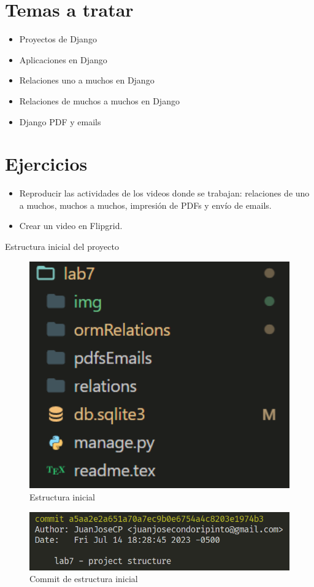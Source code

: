 \documentclass{article}
\begin{document}
\section{Temas a tratar}
        \begin{itemize}
            \item Proyectos de Django
            \item Aplicaciones en Django
            \item Relaciones uno a muchos en Django
            \item Relaciones de muchos a muchos en Django
            \item Django PDF y emails
        \end{itemize}
    
\section{Ejercicios}
\begin{itemize}
    \item Reproducir las actividades de los videos donde se trabajan: relaciones de uno a muchos, muchos a muchos, impresión de PDFs y envío de emails.
    \item Crear un video en Flipgrid.
\end{itemize} 

    Estructura inicial del proyecto
    \begin{figure}
        \centering
        \includegraphics[width=150mm]{img/img0.png}
        \caption{Estructura inicial}
        \label{fig:enter-label}
    \end{figure}
    \begin{figure}
        \centering
        \includegraphics[width=150mm]{img/commit1.png}
        \caption{Commit de estructura inicial}
        \label{fig:enter-label}
    \end{figure}
    
\end{document}
